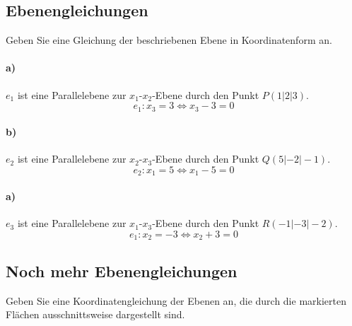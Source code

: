\documentclass{ajc}
\numberwithin{equation}{subsection}
\begin{document}
	\subsection{Ebenengleichungen}
	Geben Sie eine Gleichung der beschriebenen Ebene in Koordinatenform an.
	\paragraph{a)} $e_1$ ist eine Parallelebene zur $x_1$-$x_2$-Ebene durch den Punkt $P(1|2|3)$.
	\begin{equation}
		e_1: x_3 = 3 \Leftrightarrow x_3 - 3 = 0
	\end{equation}
	
	\paragraph{b)} $e_2$ ist eine Parallelebene zur $x_2$-$x_3$-Ebene durch den Punkt $Q(5|-2|-1)$.
	\begin{equation}
		e_2: x_1 = 5 \Leftrightarrow x_1 - 5 = 0
	\end{equation}
	
	\paragraph{a)} $e_3$ ist eine Parallelebene zur $x_1$-$x_3$-Ebene durch den Punkt $R(-1|-3|-2)$.
	\begin{equation}
		e_1: x_2 = -3 \Leftrightarrow x_2 +3 = 0
	\end{equation}
	
	\subsection{Noch mehr Ebenengleichungen}
	Geben Sie eine Koordinatengleichung der Ebenen an, die durch die markierten Flächen ausschnittsweise dargestellt sind.
	
\end{document}
